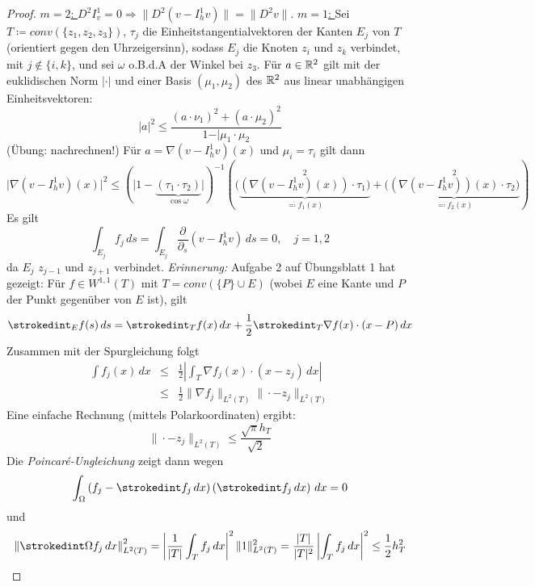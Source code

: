 \documentclass[../skript.tex]{subfiles}
\begin{document}
\begin{proof}
	\underline{$m=2$: } $D^2 I^1_v = 0 \Rightarrow \| D^2(v-I_h^1 v)\| = \|D^2 v\|$.\newline\newline\noindent
	\underline{$m=1$: } Sei $T \coloneqq conv(\{z_1,z_2,z_3\})$, $\tau_j$ die Einheitstangentialvektoren der Kanten $E_j$ von $T$ (orientiert gegen den Uhrzeigersinn), sodass $E_j$ die Knoten $z_i$ und $z_k$ verbindet, mit $j\not\in\{i,k\}$, und sei $\omega$ o.B.d.A der Winkel bei $z_3$. Für $a\in\mathbb{R}^2$ gilt mit der euklidischen Norm $\vert\cdot\vert$ und einer Basis $(\mu_1,\mu_2)$ des $\mathbb{R}^2$ aus linear unabhängigen Einheitsvektoren:
	\[
		\vert a\vert^2 \leq \frac{(a\cdot\nu_1)^2 + (a\cdot\mu_2)^2}{1-\vert \mu_1\cdot\mu_2}
	\]
	(Übung: nachrechnen!)\newline\noindent 
	Für $a = \nabla(v-I_h^1 v)(x)$ und $\mu_i = \tau_i$ gilt dann
	\[
		\vert\nabla(v-I_h^1 v)(x)\vert^2\leq (\vert 1-\underbrace{(\tau_1\cdot\tau_2)}_{\cos{\omega}}\vert )^{-1}\left( ( \underbrace{(\nabla(v-I_h^1 v)(x))\cdot\tau_1 )}_{\eqqcolon f_1(x)}^2 + ( \underbrace{(\nabla(v-I_h^1 v))(x)\cdot\tau_2)}_{\eqqcolon f_2(x)}^2 \right)
	\] 
	Es gilt
	\[
		\int_{E_j} f_j\,ds = \int_{E_j}\frac{\partial}{\partial_s}(v-I_h^1 v)\,ds = 0,\quad j=1,2 
	\]
	da $E_j$ $z_{j-1}$ und $z_{j+1}$ verbindet.\newline\newline\noindent
	\emph{Erinnerung:} Aufgabe 2 auf Übungsblatt 1 hat gezeigt: \newline Für $f\in W^{1,1}(T)$ mit $T=conv(\{P\}\cup E)$ (wobei $E$ eine Kante und $P$ der Punkt gegenüber von $E$ ist), gilt
	\[
		\strokedint_E f(s)\,ds = \strokedint_T f(x)\,dx + \frac{1}{2}\strokedint_T\nabla f(x)\cdot(x-P)\,dx
	\]
	Zusammen mit der Spurgleichung folgt
	\begin{eqnarray*}
		\int f_j(x)\,dx &\leq& \frac{1}{2}\left\vert \int_T\nabla f_j(x)\cdot(x-z_j)\,dx \right\vert\\  &\leq& \frac{1}{2}\|\nabla f_j\|_{L^2(T)}\|\cdot-z_j\|_{L^2(T)}
	\end{eqnarray*}
	Eine einfache Rechnung (mittels Polarkoordinaten) ergibt:
	\[
		\| \cdot - z_j\|_{L^2(T)}\leq\frac{\sqrt{\pi}h_T}{\sqrt{2}}
	\]
	Die \emph{Poincaré-Ungleichung} zeigt dann wegen
	\[
		\int_\Omega \left(f_j - \strokedint f_j\, dx\right)\left( \strokedint f_j\,dx \right)\,dx = 0
	\]
	und
	\[
		\left\| \strokedint\Omega f_j\,dx\right\|_{L^2(T)}^2 = \left\vert \frac{1}{\vert T\vert}\int_T f_j\,dx\right\vert^2 \|1\|_{L^2(T)}^2 = \frac{\vert T\vert}{\vert T\vert^2}\left\vert\int_T f_j\,dx\right\vert^2 \leq \frac{1}{2}h_T^2
\]
\end{proof}
\end{document}
